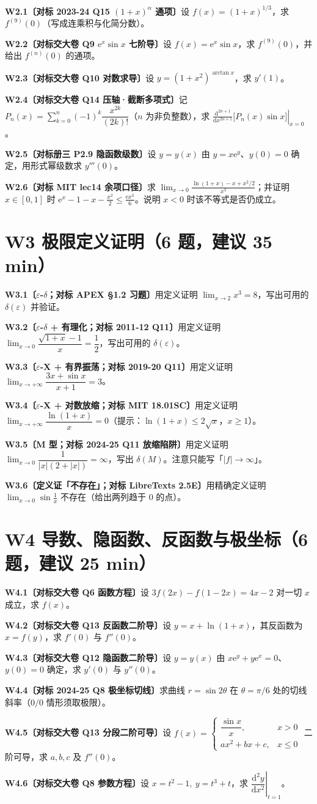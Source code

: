 \documentclass[11pt,a4paper]{ctexart}
\newcommand{\eps}{\varepsilon}
\newcommand{\ee}{\mathrm{e}}
\newcommand{\D}{\mathrm{d}}
\newcommand{\Q}[2]{\par\medskip\noindent\textbf{#1}\quad #2\par}
\begin{document}
\Q{W2.1〔对标 2023-24 Q15 $(1+x)^\alpha$ 通项〕}{设 $f(x)=(1+x)^{1/3}$，求 $f^{(9)}(0)$（写成连乘积与化简分数）。}
\Q{W2.2〔对标交大卷 Q9 $\ee^x\sin x$ 七阶导〕}{设 $f(x)=\ee^x\sin x$，求 $f^{(9)}(0)$，并给出 $f^{(n)}(0)$ 的通项。}
\Q{W2.3〔对标交大卷 Q10 对数求导〕}{设 $y=(1+x^2)^{\arctan x}$，求 $y'(1)$。}
\Q{W2.4〔对标交大卷 Q14 压轴·截断多项式〕}{记 $P_n(x)=\sum_{k=0}^{n}(-1)^k\dfrac{x^{2k}}{(2k)!}$（$n$ 为非负整数），求
$\displaystyle\left.\frac{\D^{2n+1}}{\D x^{2n+1}}\big[P_n(x)\sin x\big]\right|_{x=0}$。}
\Q{W2.5〔对标册三 P2.9 隐函数级数〕}{设 $y=y(x)$ 由 $y=x\ee^{y}$、$y(0)=0$ 确定，用形式幂级数求 $y'''(0)$。}
\Q{W2.6〔对标 MIT lec14 余项口径〕}{求 $\displaystyle\lim_{x\to0}\frac{\ln(1+x)-x+x^2/2}{x^3}$；并证明 $x\in[0,1]$ 时
$\ee^x-1-x-\frac{x^2}{2}\le\frac{\ee x^3}{6}$。说明 $x<0$ 时该不等式是否仍成立。}

\section{W3 极限定义证明（6 题，建议 35 min）}

\Q{W3.1〔$\eps$-$\delta$；对标 APEX §1.2 习题〕}{用定义证明 $\lim_{x\to2}x^3=8$，写出可用的 $\delta(\eps)$ 并验证。}
\Q{W3.2〔$\eps$-$\delta$ + 有理化；对标 2011-12 Q11〕}{用定义证明 $\lim_{x\to0}\dfrac{\sqrt{1+x}-1}{x}=\dfrac12$，写出可用的 $\delta(\eps)$。}
\Q{W3.3〔$\eps$-X + 有界振荡；对标 2019-20 Q11〕}{用定义证明 $\lim_{x\to+\infty}\dfrac{3x+\sin x}{x+1}=3$。}
\Q{W3.4〔$\eps$-X + 对数放缩；对标 MIT 18.01SC〕}{用定义证明 $\lim_{x\to+\infty}\dfrac{\ln(1+x)}{x}=0$（提示：$\ln(1+x)\le2\sqrt{x}$，$x\ge1$）。}
\Q{W3.5〔M 型；对标 2024-25 Q11 放缩陷阱〕}{用定义证明 $\lim_{x\to0}\dfrac1{|x|(2+|x|)}=\infty$，写出 $\delta(M)$。注意只能写「$|f|\to\infty$」。}
\Q{W3.6〔定义证「不存在」；对标 LibreTexts 2.5E〕}{用精确定义证明 $\lim_{x\to0}\sin\frac1x$ 不存在（给出两列趋于 0 的点）。}

\section{W4 导数、隐函数、反函数与极坐标（6 题，建议 25 min）}

\Q{W4.1〔对标交大卷 Q6 函数方程〕}{设 $3f(2x)-f(1-2x)=4x-2$ 对一切 $x$ 成立，求 $f(x)$。}
\Q{W4.2〔对标交大卷 Q13 反函数二阶导〕}{设 $y=x+\ln(1+x)$，其反函数为 $x=f(y)$，求 $f'(0)$ 与 $f''(0)$。}
\Q{W4.3〔对标交大卷 Q12 隐函数二阶导〕}{设 $y=y(x)$ 由 $x\ee^{y}+y\ee^{x}=0$、$y(0)=0$ 确定，求 $y'(0)$ 与 $y''(0)$。}
\Q{W4.4〔对标 2024-25 Q8 极坐标切线〕}{求曲线 $r=\sin2\theta$ 在 $\theta=\pi/6$ 处的切线斜率（$0/0$ 情形须取极限）。}
\Q{W4.5〔对标交大卷 Q13 分段二阶可导〕}{设 $f(x)=\begin{cases}\dfrac{\sin x}{x},&x>0\\[2pt] ax^2+bx+c,&x\le0\end{cases}$ 二阶可导，求 $a,b,c$ 及 $f''(0)$。}
\Q{W4.6〔对标交大卷 Q8 参数方程〕}{设 $x=t^2-1,\ y=t^3+t$，求 $\left.\dfrac{\D^2y}{\D x^2}\right|_{t=1}$。}
\end{document}
